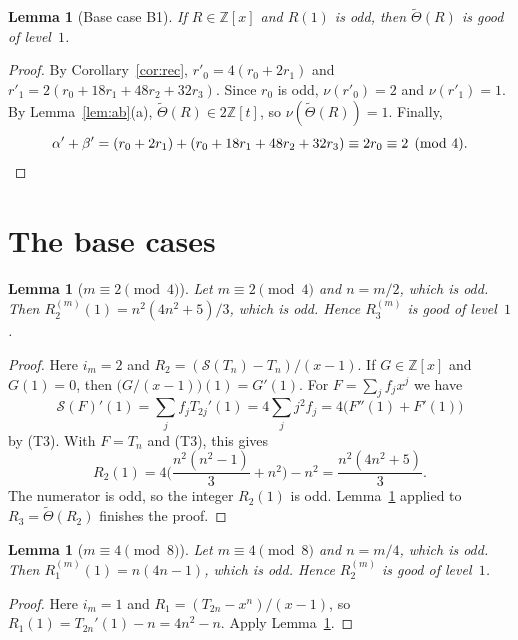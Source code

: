 \documentclass[11pt]{amsart}
\newtheorem{lemma}[theorem]{Lemma}
\theoremstyle{definition}
\theoremstyle{remark}
\newcommand{\Z}{\mathbb{Z}}
\newcommand{\Sop}{\mathcal{S}}
\newcommand{\Th}{\widetilde{\Theta}}
\begin{document}
\begin{lemma}[Base case B1]\label{lem:B1}
If $R\in\Z[x]$ and $R(1)$ is odd, then $\Th(R)$ is good of level~$1$.
\end{lemma}
\begin{proof}
By Corollary~\ref{cor:rec}, $r'_0=4(r_0+2r_1)$ and $r'_1=2(r_0+18r_1+48r_2+32r_3)$. Since $r_0$ is odd, $\nu(r'_0)=2$ and $\nu(r'_1)=1$. By Lemma~\ref{lem:ab}(a), $\Th(R)\in2\Z[t]$, so $\nu(\Th(R))=1$. Finally,
\[
  \alpha'+\beta'=(r_0+2r_1)+(r_0+18r_1+48r_2+32r_3)\equiv2r_0\equiv2\pmod 4.\qedhere
\]
\end{proof}

\section{The base cases}\label{sec:base}

\begin{lemma}[$m\equiv2\pmod4$]\label{lem:base2}
Let $m\equiv2\pmod 4$ and $n=m/2$, which is odd. Then $R^{(m)}_2(1)=n^2(4n^2+5)/3$, which is odd. Hence $R^{(m)}_3$ is good of level~$1$.
\end{lemma}
\begin{proof}
Here $i_m=2$ and $R_2=(\Sop(T_n)-T_n)/(x-1)$. If $G\in\Z[x]$ and $G(1)=0$, then $\big(G/(x-1)\big)(1)=G'(1)$. For $F=\sum_jf_jx^j$ we have
\[
  \Sop(F)'(1)=\sum_jf_jT_{2j}'(1)=4\sum_jj^2f_j=4\big(F''(1)+F'(1)\big)
\]
by (T3). With $F=T_n$ and (T3), this gives
\[
  R_2(1)=4\Big(\frac{n^2(n^2-1)}3+n^2\Big)-n^2=\frac{n^2(4n^2+5)}{3}.
\]
The numerator is odd, so the integer $R_2(1)$ is odd. Lemma~\ref{lem:B1} applied to $R_3=\Th(R_2)$ finishes the proof.
\end{proof}

\begin{lemma}[$m\equiv4\pmod 8$]\label{lem:base4}
Let $m\equiv4\pmod8$ and $n=m/4$, which is odd. Then $R^{(m)}_1(1)=n(4n-1)$, which is odd. Hence $R^{(m)}_2$ is good of level~$1$.
\end{lemma}
\begin{proof}
Here $i_m=1$ and $R_1=(T_{2n}-x^n)/(x-1)$, so $R_1(1)=T_{2n}'(1)-n=4n^2-n$. Apply Lemma~\ref{lem:B1}.
\end{proof}
\end{document}
